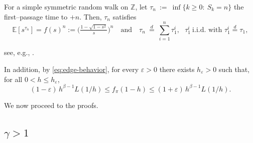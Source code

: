 \documentclass[preprint]{imsart}
\newcommand{\EE}{\mathbb{E}}
\newcommand{\1}{\mathbf{1}}
\theoremstyle{plain}
\theoremstyle{definition}
\begin{document}
For a simple symmetric random walk on $\mathbb{Z}$, let \(\tau_n\ :=\ \inf\{k\ge0:\ S_k=n\}\) the first–passage time to $+n$. Then, \(\tau_n\) satisfies
\begin{equation}\label{sumindp}
\EE[s^{\tau_n}]=f(s)^n:=\Big(\tfrac{1-\sqrt{1-s^2}}{s}\Big)^{\!n}
\quad\text{and}\quad
\tau_n\ \stackrel{d}{=}\ \sum_{i=1}^{n} \tau_1^{i},\ \ \ \tau_1^{i}\ \text{i.i.d. with }\tau_1^{i}\stackrel{d}{=}\tau_1,
\end{equation}

see, e.g., \cite[Lemma 19, Theorem 33]{Konstantopoulos09}. 

In addition, by \eqref{eq:edge-behavior}, for every \(\varepsilon>0\) there exists \(h_{\varepsilon}>0\) such that, for all \(0<h\le h_{\varepsilon}\),
\begin{equation}\label{eq:edge-band}
(1-\varepsilon)\,h^{\beta-1}L(1/h)
\le f_\pi(1-h)\le
(1+\varepsilon)\,h^{\beta-1}L(1/h).
\end{equation}


We now proceed to the proofs.

\subsection{$\gamma>1$}\label{sec:gamma>1}
\end{document}
